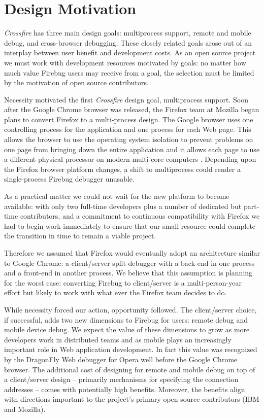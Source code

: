 \section{Design Motivation}
\textit{Crossfire} has three main design goals: multiprocess support, remote and
mobile debug, and cross-browser debugging. These closely related goals arose out
of an interplay between user benefit and development costs. As an open source
project we must work with development resources motivated by goals: no matter
how much value Firebug users may receive from a goal, the selection must be
limited by the motivation of open source contributors.

Necessity motivated the first \textit{Crossfire} design goal, multiprocess
support. Soon after the Google Chrome browser was released, the Firefox team at
Mozilla began plans to convert Firefox to a multi-process design.  The Google
browser uses one controlling process for the application and one process for
each Web page.  This allows the browser to use the operating system isolation to
prevent problems on one page from bringing down the entire application and it
allows each page to use a different physical processor on modern multi-core
computers \cite{GoogleChrome}.  Depending upon the Firefox browser platform
changes, a shift to multiprocess could render a single-process Firebug debugger unusable.

 As a practical
matter we could not wait for the new platform to become available: with only
two full-time developers plus a number of dedicated but part-time contributors,
and a commitment to continuous compatibility with Firefox we had to begin work
immediately to ensure that our small resource could complete the transition in
time to remain a viable project.

Therefore we assumed that Firefox would eventually adopt
an architecture similar to Google Chrome: a client/server split debugger with a
back-end in one process and a front-end in another process.  We believe
that this assumption is planning for the worst case: converting Firebug to
client/server is a multi-person-year effort but likely to work with what
ever the Firefox team decides to do.

While necessity forced our action, opportunity followed. The client/server
choice, if successful, adds two new dimensions to Firebug for users: remote
debug and mobile device debug. We expect the value of these dimensions to grow
as more developers work in distributed teams and as mobile plays an increasingly
important role in Web application development.  In fact this value was
recognized by the DragonFly Web debugger for Opera\cite{opera-dragonfly} well before the Google
Chrome browser.\cite{WebInspector} The additional cost of designing for remote and mobile debug
on top of a client/server design -- primarily mechanisms for specifying the
connection addresses -- comes with potentially high benefits.  Moreover, the
benefits align with directions important to the project's primary open source
contributors (IBM and Mozilla).

